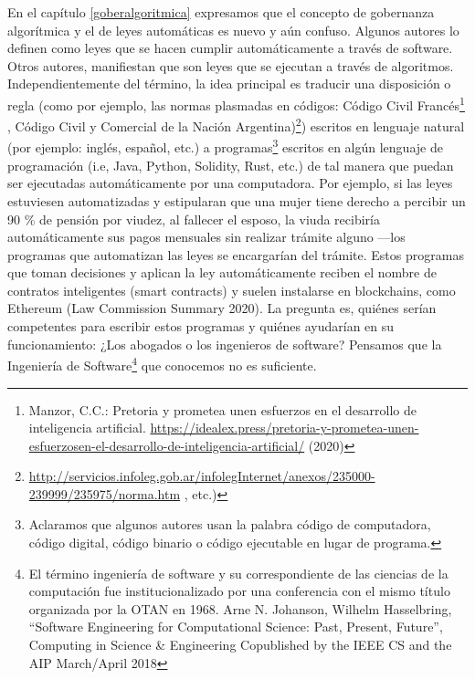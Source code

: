 \documentclass[12pt]{report} %
\begin{document}
En el capítulo \ref{goberalgoritmica} expresamos que el concepto de gobernanza algorítmica y el de leyes automáticas es nuevo y aún confuso. Algunos autores lo definen como leyes que se hacen cumplir automáticamente a través de software. Otros autores, manifiestan que son leyes que se ejecutan a través de algoritmos. Independientemente del término, la idea principal es traducir una disposición o regla (como por ejemplo, las normas plasmadas en códigos: Código Civil Francés\footnote{Manzor, C.C.: Pretoria y prometea unen esfuerzos en el desarrollo de inteligencia artificial. \url{https://idealex.press/pretoria-y-prometea-unen-esfuerzosen-el-desarrollo-de-inteligencia-artificial/} (2020)} , Código Civil y Comercial de la Nación Argentina)\footnote {\url{http://servicios.infoleg.gob.ar/infolegInternet/anexos/235000-239999/235975/norma.htm} , etc.) }) escritos en lenguaje natural (por ejemplo: inglés, español, etc.) a programas\footnote{Aclaramos que algunos autores usan la palabra código de computadora, código digital, código binario o código ejecutable en lugar de programa.}  escritos en algún lenguaje de programación (i.e, Java, Python, Solidity, Rust, etc.) de tal manera que puedan ser ejecutadas automáticamente por una computadora. Por ejemplo, si las leyes estuviesen automatizadas y estipularan que una mujer tiene derecho a percibir un 90 \% de pensión por viudez, al fallecer el esposo, la viuda recibiría automáticamente sus pagos mensuales sin realizar trámite alguno —los programas que automatizan las leyes se encargarían del trámite. Estos programas que toman decisiones y aplican la ley automáticamente reciben el nombre de contratos inteligentes (smart contracts) y suelen instalarse en blockchains, como Ethereum (Law Commission Summary 2020). La pregunta es, quiénes serían competentes para escribir estos programas y quiénes ayudarían en su funcionamiento: ¿Los abogados o los ingenieros de software? Pensamos que la Ingeniería de Software\footnote{El término ingeniería de software y su correspondiente de las ciencias de la computación fue institucionalizado por una conferencia con el mismo título organizada por la OTAN en 1968. Arne N. Johanson, Wilhelm Hasselbring, “Software Engineering for Computational Science: Past, Present, Future”, Computing in Science \& Engineering Copublished by the IEEE CS and the AIP March/April 2018}  que conocemos no es suficiente.
\end{document}
